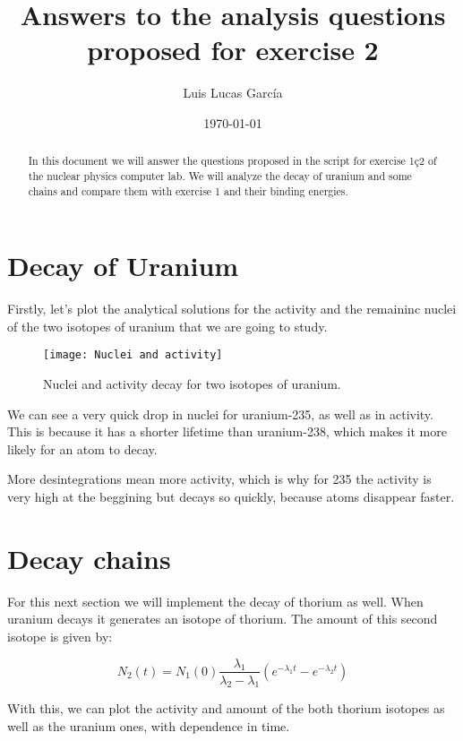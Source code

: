 \documentclass{article} %
\author{Luis Lucas García}
\title{Answers to the analysis questions proposed for exercise 2}
\date{\today}
\affil{Facultad de ciencias - Universidad de Alicante - Física nuclear y de partículas - Grupo L3 - Grado en física}
\begin{document}
\maketitle
\begin{abstract}
In this document we will answer the questions proposed in the script for exercise 1ç2 of the nuclear physics computer lab. We will analyze the decay of uranium and some chains and compare them with exercise 1 and their binding energies.
\end{abstract}
\tableofcontents

\section{Decay of Uranium}

Firstly, let's plot the analytical solutions for the activity and the remaininc nuclei of the two isotopes of uranium that we are going to study.

\begin{figure}[h!]
\begin{center}
\texttt{[image: Nuclei and activity]}
\caption{Nuclei and activity decay for two isotopes of uranium.}
\end{center}
\end{figure}

We can see a very quick drop in nuclei for uranium-235, as well as in activity. This is because it has a shorter lifetime than uranium-238, which makes it more likely for an atom to decay.

More desintegrations mean more activity, which is why for 235 the activity is very high at the beggining but decays so quickly, because atoms disappear faster.

\section{Decay chains}

For this next section we will implement the decay of thorium as well. When uranium decays it generates an isotope of thorium. The amount of this second isotope is given by:

\begin{equation}
N_2(t) = N_1(0)\frac{\lambda_1}{\lambda_2 - \lambda_1} \left( e^{-\lambda_1 t} - e^{-\lambda_2 t} \right)
\end{equation}

With this, we can plot the activity and amount of the both thorium isotopes as well as the uranium ones, with dependence in time.
\end{document}
